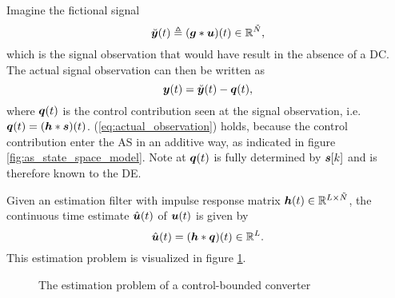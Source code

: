 Imagine the fictional signal
\begin{equation}
    \label{eq:def_y_breve}
    \breve{\bm{y}}(t) \triangleq (\bm{g} * \bm{u})(t) \in \mathbb{R}^{\tilde{N}},
\end{equation}
which is the signal observation that would have result in the absence of a DC. The actual signal observation can then be written as
\begin{equation}
    \label{eq:actual_observation}
    \bm{y}(t) = \breve{\bm{y}}(t) -\bm{q}(t),
\end{equation}
where $\bm{q}(t)$ is the control contribution seen at the signal observation, i.e. $\bm{q}(t) = (\bm{h}*\bm{s})(t)$. (\ref{eq:actual_observation}) holds, because the control contribution enter the AS in an additive way, as indicated in figure \ref{fig:as_state_space_model}. Note at $\bm{q}(t)$ is fully determined by $\bm{s}[k]$ and is therefore known to the DE.

Given an estimation filter with impulse response matrix $\bm{h}(t) \in \mathbb{R}^{L \times \tilde{N}}$, the continuous time estimate $\hat{\bm{u}}(t)$ of $\bm{u}(t)$ is given by
\begin{equation}
    \label{eq:uhat_conv_h_q}
    \hat{\bm{u}}(t) = (\bm{h} * \bm{q})(t) \in \mathbb{R}^{L}.
\end{equation}
This estimation problem is visualized in figure \ref{fig:cbc_estimation_problem}.
\begin{figure}[htbp]
    \centering
    
    \caption{The estimation problem of a control-bounded converter}
    \label{fig:cbc_estimation_problem}
\end{figure}

